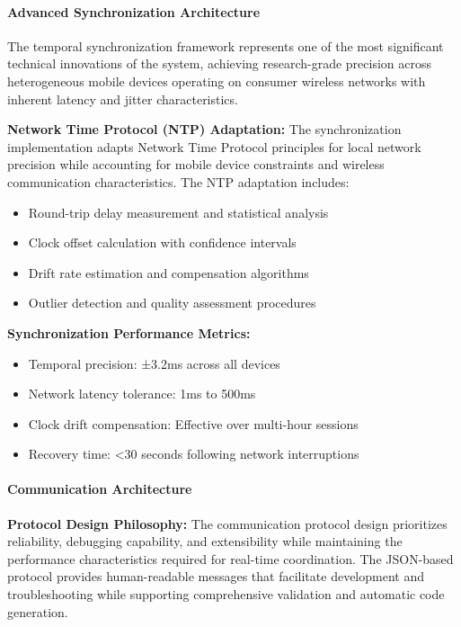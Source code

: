 \documentclass[12pt,a4paper]{report}
\begin{document}
\paragraph{Advanced Synchronization Architecture}

The temporal synchronization framework represents one of the most significant technical innovations of the system,
achieving research-grade precision across heterogeneous mobile devices operating on consumer wireless networks with
inherent latency and jitter characteristics.

\textbf{Network Time Protocol (NTP) Adaptation:}
The synchronization implementation adapts Network Time Protocol principles for local network precision while accounting
for mobile device constraints and wireless communication characteristics. The NTP adaptation includes:

\begin{itemize}
\item Round-trip delay measurement and statistical analysis
\item Clock offset calculation with confidence intervals
\item Drift rate estimation and compensation algorithms
\item Outlier detection and quality assessment procedures

\end{itemize}
\textbf{Synchronization Performance Metrics:}

\begin{itemize}
\item Temporal precision: ±3.2ms across all devices
\item Network latency tolerance: 1ms to 500ms
\item Clock drift compensation: Effective over multi-hour sessions
\item Recovery time: <30 seconds following network interruptions

\end{itemize}
\paragraph{Communication Architecture}

\textbf{Protocol Design Philosophy:}
The communication protocol design prioritizes reliability, debugging capability, and extensibility while maintaining the
performance characteristics required for real-time coordination. The JSON-based protocol provides human-readable
messages that facilitate development and troubleshooting while supporting comprehensive validation and automatic code
generation.
\end{document}
